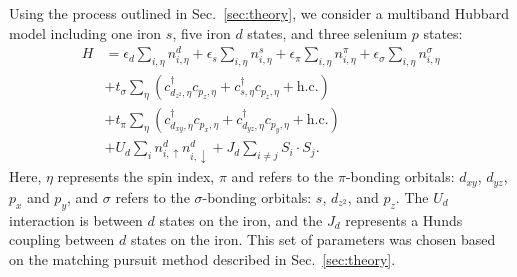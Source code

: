 Using the process outlined in Sec.~\ref{sec:theory}, we consider a multiband Hubbard model including one iron $s$, five iron $d$ states, and three selenium $p$ states:
\begin{align*}
  H 
  &=
  \epsilon_d \sum_{i,\eta} n^{d}_{i,\eta} 
  +
  \epsilon_s \sum_{i,\eta} n^{s}_{i,\eta} 
  +
  \epsilon_\pi \sum_{i,\eta} n^{\pi}_{i,\eta} 
  +
  \epsilon_\sigma \sum_{i,\eta} n^{\sigma}_{i,\eta} 
  \\
  &+ 
  t_{\sigma} \sum_{\eta} \left( c_{d_{z^2},\eta}^{\dagger} c_{p_z,\eta} + c_{s,\eta}^{\dagger}  c_{p_z,\eta} + \text{h.c.} \right)
  \\
  &+ 
  t_{\pi} \sum_{\eta} \left( c_{d_{xy},\eta}^{\dagger} c_{p_x,\eta} + c_{d_{yz},\eta}^{\dagger}  c_{p_y,\eta} + \text{h.c.} \right)
  \\
  &+
  U_d \sum_{i} n^{d}_{i,\uparrow} n^{d}_{i,\downarrow} 
  +
  J_d \sum_{i\ne j} S_i \cdot S_j.
\end{align*}
Here, $\eta$ represents the spin index, $\pi$ and refers to the $\pi$-bonding orbitals: $d_{xy}$, $d_{yz}$, $p_x$ and $p_y$, and $\sigma$ refers to the $\sigma$-bonding orbitals: $s$, $d_{z^2}$, and $p_z$. 
The $U_d$ interaction is between $d$ states on the iron, and the $J_d$ represents a Hunds coupling between $d$ states on the iron.
This set of parameters was chosen based on the matching pursuit method described in Sec.~\ref{sec:theory}.
%
%

